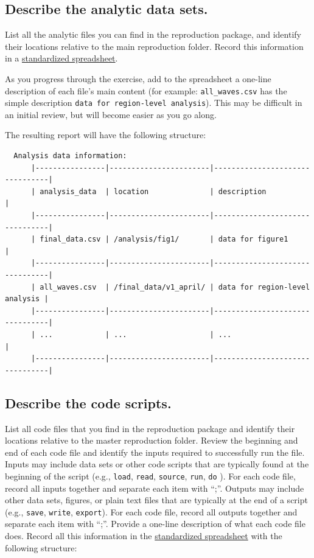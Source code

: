 \documentclass[]{book}
\begin{document}
\hypertarget{desc-analy}{%
\subsection{Describe the analytic data sets.}\label{desc-analy}}

List all the analytic files you can find in the reproduction package, and identify their locations relative to the main reproduction folder. Record this information in a \href{https://docs.google.com/spreadsheets/d/1LUIdVFH0OfR70C7z07TYeE-uWzKI_JIeWUMaYhqEKK0/edit\#gid=1299317837\&range=A1}{standardized spreadsheet}.

As you progress through the exercise, add to the spreadsheet a one-line description of each file's main content (for example: \texttt{all\_waves.csv} has the simple description \texttt{data\ for\ region-level\ analysis}). This may be difficult in an initial review, but will become easier as you go along.

The resulting report will have the following structure:

\begin{verbatim}
  Analysis data information:
      |----------------|-----------------------|--------------------------------|
      | analysis_data  | location              | description                    |
      |----------------|-----------------------|--------------------------------|
      | final_data.csv | /analysis/fig1/       | data for figure1               |
      |----------------|-----------------------|--------------------------------|
      | all_waves.csv  | /final_data/v1_april/ | data for region-level analysis |
      |----------------|-----------------------|--------------------------------|
      | ...            | ...                   | ...                            |
      |----------------|-----------------------|--------------------------------|
\end{verbatim}

\hypertarget{desc-scripts}{%
\subsection{Describe the code scripts.}\label{desc-scripts}}

List all code files that you find in the reproduction package and identify their locations relative to the master reproduction folder. Review the beginning and end of each code file and identify the inputs required to successfully run the file. Inputs may include data sets or other code scripts that are typically found at the beginning of the script (e.g., \texttt{load}, \texttt{read}, \texttt{source}, \texttt{run}, \texttt{do} ). For each code file, record all inputs together and separate each item with ``;''. Outputs may include other data sets, figures, or plain text files that are typically at the end of a script (e.g., \texttt{save}, \texttt{write}, \texttt{export}). For each code file, record all outputs together and separate each item with ``;''. Provide a one-line description of what each code file does. Record all this information in the \href{https://docs.google.com/spreadsheets/d/1LUIdVFH0OfR70C7z07TYeE-uWzKI_JIeWUMaYhqEKK0/edit\#gid=1617799822\&range=A1}{standardized spreadsheet} with the following structure:
\end{document}
